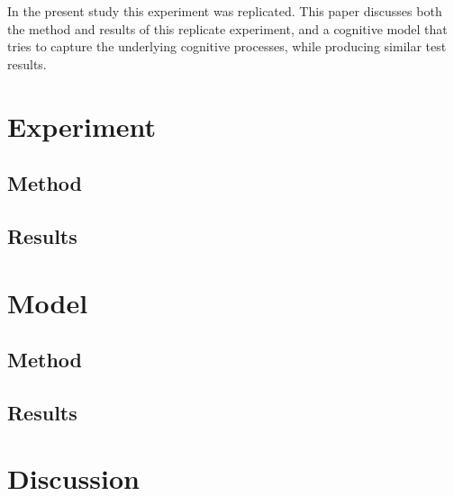 \documentclass[10pt,letterpaper]{article}
\begin{document}
In the present study this experiment was replicated. This paper discusses both the method and results of this replicate experiment, and a cognitive model that tries to capture the underlying cognitive processes, while producing similar test results.

\section{Experiment}
\subsection{Method}
\subsection{Results}

\section{Model}
\subsection{Method}
\subsection{Results}

\section{Discussion}




\setlength{\bibleftmargin}{.125in}
\setlength{\bibindent}{-\bibleftmargin}

\end{document}
